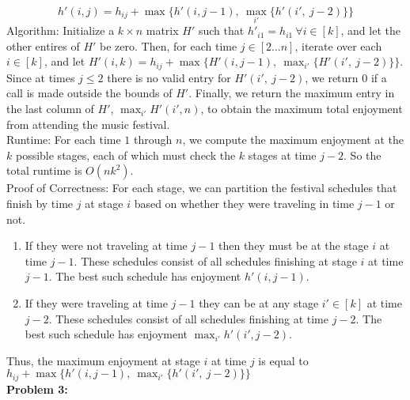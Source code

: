 \documentclass{article}
\begin{document}
\begin{equation*}
    h'(i, j) = h_{ij} + \max \{h'(i, j - 1),\ \max_{i'}\{h'(i',\ j - 2)\}\}
\end{equation*}
Algorithm: Initialize a $k \times n$ matrix $H'$ such that $h'_{i1} = h_{i1}\ \forall i \in [k]$, and let the other entires of $H'$ be zero. Then, for each time $j \in [2 \dots n]$, iterate over each $i \in [k]$, and let $H'(i, k) = h_{ij} + \max \{H'(i, j - 1),\ \max_{i'}\{H'(i',\ j - 2)\}\}$. Since at times $j \leq 2$ there is no valid entry for $H'(i',\ j - 2)$,
we return $0$ if a call is made outside the bounds of $H'$. Finally, we return the maximum entry in the last column of $H'$, $\max_{i'}H'(i', n)$, to obtain the maximum total enjoyment from attending the music festival. \\[0.5ex]
Runtime: For each time $1$ through $n$, we compute the maximum enjoyment at the $k$ possible stages, each of which must check the $k$ stages at time $j - 2$. So the total runtime is $O(nk^2)$. \\[0.5ex]
Proof of Correctness: For each stage, we can partition the festival schedules that finish by time $j$ at stage $i$ based on whether they were traveling in time $j - 1$ or not. \begin{enumerate}
    \item If they were not traveling at time $j - 1$ then they must be at the stage $i$ at time $j - 1$. These schedules consist of all schedules finishing at stage $i$ at time $j - 1$. The best such schedule has enjoyment $h'(i, j - 1)$.
    \item If they were traveling at time $j - 1$ they can be at any stage $i' \in [k]$ at time $j - 2$. These schedules consist of all schedules finishing at time $j - 2$. The best such schedule has enjoyment $\max_{i'}h'(i', j - 2)$.
\end{enumerate}
Thus, the maximum enjoyment at stage $i$ at time $j$ is equal to $h_{ij}  + \max \{h'(i, j - 1),\ \max_{i'}\{h'(i',\ j - 2)\}\}$
\\[1.0ex]
\textbf{Problem 3:}
\end{document}
